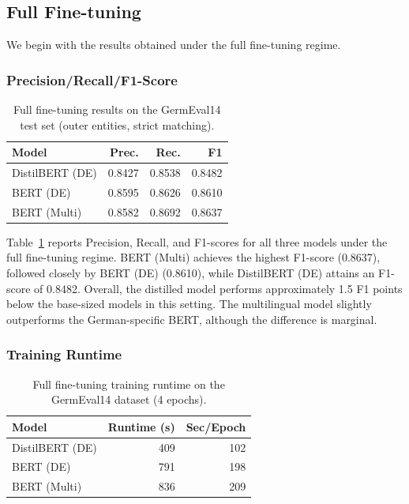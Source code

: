 \documentclass[11pt,a4paper,twocolumn]{article}
\begin{document}
\subsection{Full Fine-tuning}
We begin with the results obtained under the full fine-tuning regime.

\subsubsection{Precision/Recall/F1-Score}
\begin{table}[h]
    \centering
    \begin{tabular}{lrrr}
        \toprule
        \textbf{Model} & \textbf{Prec.} & \textbf{Rec.} & \textbf{F1} \\
        \midrule
        DistilBERT (DE) & 0.8427 & 0.8538 & 0.8482 \\
        BERT (DE) & 0.8595 & 0.8626 & 0.8610 \\
        BERT (Multi) & 0.8582 & 0.8692 & 0.8637 \\
        \bottomrule
    \end{tabular}
    \caption{Full fine-tuning results on the GermEval14 test set (outer entities, strict matching).}
    \label{tab:full-finetuning-results}
\end{table}

Table~\ref{tab:full-finetuning-results} reports Precision, Recall, and F1-scores for all three models under the full fine-tuning regime.
BERT (Multi) achieves the highest F1-score (0.8637), followed closely by BERT (DE) (0.8610), while DistilBERT (DE) attains an F1-score of 0.8482.
Overall, the distilled model performs approximately 1.5 F1 points below the base-sized models in this setting. The multilingual model slightly outperforms the German-specific BERT, although the difference is marginal.

\subsubsection{Training Runtime}
\begin{table}[h]
    \centering
    \begin{tabular}{lrr}
        \toprule
        \textbf{Model} & \textbf{Runtime (s)} & \textbf{Sec/Epoch} \\
        \midrule
        DistilBERT (DE) & 409 & 102\\
        BERT (DE) & 791 & 198\\
        BERT (Multi) & 836 & 209\\
        \bottomrule
    \end{tabular}
    \caption{Full fine-tuning training runtime on the GermEval14 dataset (4 epochs).}
    \label{tab:full-finetuning-runtime}
\end{table}
\end{document}
